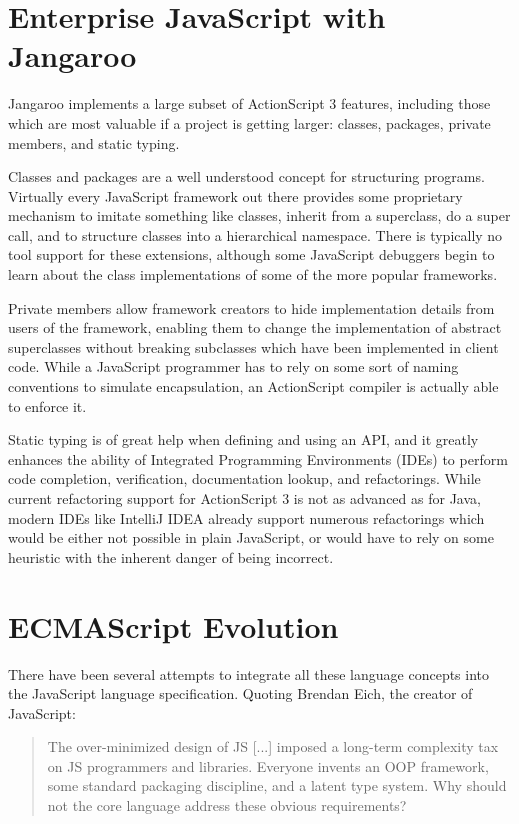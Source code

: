 \documentclass[11pt]{sigplanconf}
\begin{document}
\section{Enterprise JavaScript with Jangaroo}

Jangaroo implements a large subset of ActionScript 3 features, including those which are most valuable if a project is getting larger: classes, packages, private members, and static typing.

Classes and packages are a well understood concept for structuring programs. Virtually every JavaScript framework out there provides some proprietary mechanism to imitate something like classes, inherit from a superclass, do a super call, and to structure classes into a hierarchical namespace. There is typically no tool support for these extensions, although some JavaScript debuggers begin to learn about the class implementations of some of the more popular frameworks\citep{firebug-plugin-illuminations}.

Private members allow framework creators to hide implementation details from users of the framework, enabling them to change the implementation of abstract superclasses without breaking subclasses which have been implemented in client code. While a JavaScript programmer has to rely on some sort of naming conventions to simulate encapsulation, an ActionScript compiler is actually able to enforce it.

Static typing is of great help when defining and using an API, and it greatly enhances the ability of Integrated Programming Environments (IDEs) to perform code completion, verification, documentation lookup, and refactorings. While current refactoring support for ActionScript 3 is not as advanced as for Java, modern IDEs like IntelliJ IDEA\citep{idea} already support numerous refactorings which would be either not possible in plain JavaScript, or would have to rely on some heuristic with the inherent danger of being incorrect.

\section{ECMAScript Evolution}

There have been several attempts to integrate all these language concepts into the JavaScript language specification. Quoting Brendan Eich, the creator of Java\-Script:

\begin{quotation}
The over-minimized design of JS [...] imposed a long-term complexity tax on JS programmers and libraries. Everyone invents an OOP framework, some standard packaging discipline, and a latent type system. Why should not the core language address these obvious requirements?\citep{Eich2007-comment-open-letter}
\end{quotation}
\end{document}
